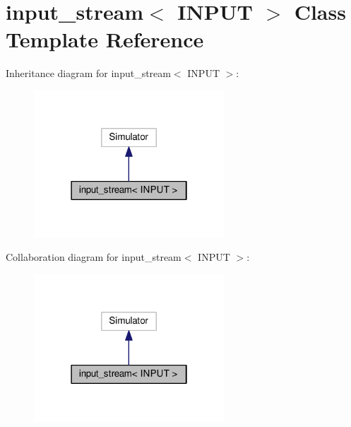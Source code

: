 \hypertarget{classinput__stream}{}\section{input\+\_\+stream$<$ I\+N\+P\+UT $>$ Class Template Reference}
\label{classinput__stream}


Inheritance diagram for input\+\_\+stream$<$ I\+N\+P\+UT $>$\+:\nopagebreak
\begin{figure}[H]
\begin{center}
\leavevmode
\includegraphics[width=202pt]{classinput__stream__inherit__graph}
\end{center}
\end{figure}


Collaboration diagram for input\+\_\+stream$<$ I\+N\+P\+UT $>$\+:\nopagebreak
\begin{figure}[H]
\begin{center}
\leavevmode
\includegraphics[width=202pt]{classinput__stream__coll__graph}
\end{center}
\end{figure}
